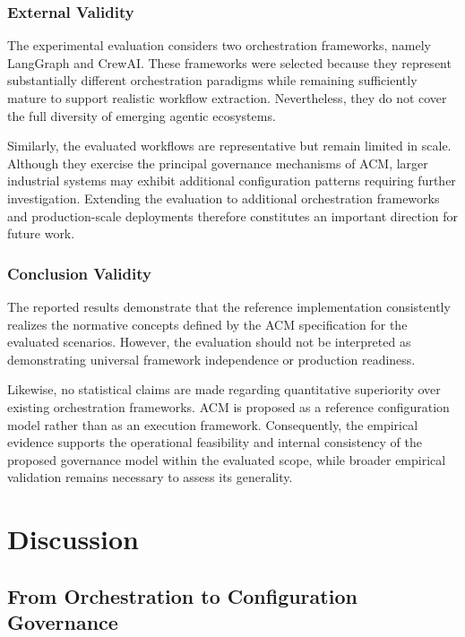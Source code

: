 \documentclass[10pt]{article}
\begin{document}
\subsubsection{External Validity}

The experimental evaluation considers two orchestration frameworks, namely LangGraph and CrewAI. These frameworks were selected because they represent substantially different orchestration paradigms while remaining sufficiently mature to support realistic workflow extraction. Nevertheless, they do not cover the full diversity of emerging agentic ecosystems.

Similarly, the evaluated workflows are representative but remain limited in scale. Although they exercise the principal governance mechanisms of ACM, larger industrial systems may exhibit additional configuration patterns requiring further investigation. Extending the evaluation to additional orchestration frameworks and production-scale deployments therefore constitutes an important direction for future work.

\subsubsection{Conclusion Validity}

The reported results demonstrate that the reference implementation consistently realizes the normative concepts defined by the ACM specification for the evaluated scenarios. However, the evaluation should not be interpreted as demonstrating universal framework independence or production readiness.

Likewise, no statistical claims are made regarding quantitative superiority over existing orchestration frameworks. ACM is proposed as a reference configuration model rather than as an execution framework. Consequently, the empirical evidence supports the operational feasibility and internal consistency of the proposed governance model within the evaluated scope, while broader empirical validation remains necessary to assess its generality.

\section{Discussion}
\label{sec:discusion}
\subsection{From Orchestration to Configuration Governance}
\end{document}
